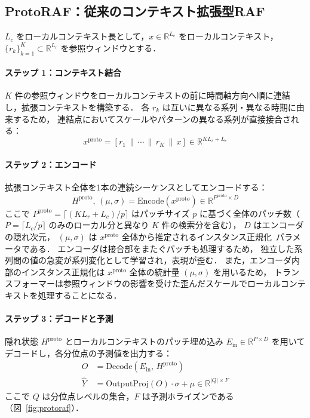 \documentclass[twocolumn, lastpage]{jarticle}
\begin{document}
\subsection{ProtoRAF：従来のコンテキスト拡張型RAF}
$L_c$ をローカルコンテキスト長として，$x \in \mathbb{R}^{L_c}$ をローカルコンテキスト，
$\{r_k\}_{k=1}^{K} \subset \mathbb{R}^{L_r}$ を参照ウィンドウとする．

    \paragraph{ステップ 1：コンテキスト結合}
    $K$ 件の参照ウィンドウをローカルコンテキストの前に時間軸方向へ順に連結し，拡張コンテキストを構築する．
    各 $r_k$ は互いに異なる系列・異なる時期に由来するため，
    連結点においてスケールやパターンの異なる系列が直接接合される：
        \begin{equation}
            x^{\mathrm{proto}} = [r_1 \,\|\, \cdots \,\|\, r_K \,\|\, x] \in \mathbb{R}^{K L_r + L_c}
        \end{equation}

    \paragraph{ステップ 2：エンコード}
    拡張コンテキスト全体を1本の連続シーケンスとしてエンコードする：
        \begin{equation}
            H^{\mathrm{proto}},\, (\mu, \sigma) = \mathrm{Encode}(x^{\mathrm{proto}})
            \in \mathbb{R}^{P^{\mathrm{proto}} \times D}
        \end{equation}
    ここで $P^{\mathrm{proto}} = \lceil (K L_r + L_c) / p \rceil$ はパッチサイズ $p$ に基づく全体のパッチ数（$P = \lceil L_c / p \rceil$ のみのローカル分と異なり $K$ 件の検索分を含む），
    $D$ はエンコーダの隠れ次元，
    $(\mu, \sigma)$ は $x^{\mathrm{proto}}$ 全体から推定されるインスタンス正規化~\cite{Kim.2022}パラメータである．
    エンコーダは接合部をまたぐパッチも処理するため，
    独立した系列間の値の急変が系列変化として学習され，表現が歪む．
    また，エンコーダ内部のインスタンス正規化は $x^{\mathrm{proto}}$ 全体の統計量 $(\mu, \sigma)$ を用いるため，
    トランスフォーマーは参照ウィンドウの影響を受けた歪んだスケールでローカルコンテキストを処理することになる．

    \paragraph{ステップ 3：デコードと予測}
    隠れ状態 $H^{\mathrm{proto}}$ とローカルコンテキストのパッチ埋め込み $E_{\mathrm{in}} \in \mathbb{R}^{P \times D}$ を用いて
    デコードし，各分位点の予測値を出力する：
        \begin{align}
            O &= \mathrm{Decode}(E_{\mathrm{in}},\, H^{\mathrm{proto}}) \\
            \hat{Y} &= \mathrm{OutputProj}(O) \cdot \sigma + \mu \in \mathbb{R}^{|Q| \times F}
        \end{align}
    ここで $Q$ は分位点レベルの集合，$F$ は予測ホライズンである（図~\ref{fig:protoraf}）．
\end{document}
